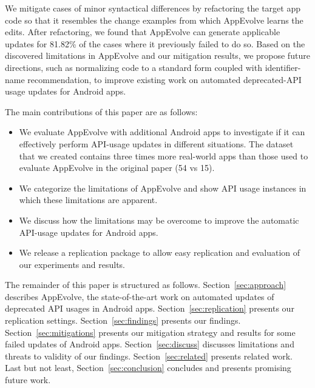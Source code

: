 We mitigate cases of minor syntactical differences by refactoring the
target app code so that it resembles the change examples from which
AppEvolve learns the edits.  After refactoring, we found that AppEvolve can
generate applicable updates for 81.82\% of the cases where it previously failed
to do so.  Based on the discovered limitations in AppEvolve and our
mitigation results, we propose future directions, such as normalizing code
to a standard form coupled with identifier-name recommendation, to improve
existing work on automated deprecated-API usage updates for Android apps.

The main contributions of this paper are as follows:
\begin{itemize}
	\item We  evaluate AppEvolve with additional Android apps to investigate if it can effectively perform API-usage updates in different situations. The dataset that we created contains three times more real-world apps than those used to evaluate AppEvolve in the original paper (54 vs 15).
	\item We categorize the limitations of AppEvolve and show API usage instances in which these limitations are apparent.
	\item We discuss how the limitations may be overcome to improve the automatic API-usage updates for Android apps.
	\item We release a replication package to allow easy replication and evaluation of our experiments and results.%
\end{itemize}

The remainder of this paper is structured as follows. Section~\ref{sec:approach} describes AppEvolve, the state-of-the-art work on automated updates of deprecated API usages in Android apps. Section~\ref{sec:replication} presents our replication settings. Section~\ref{sec:findings} presents our findings. Section~\ref{sec:mitigations} presents our mitigation strategy and results for some failed updates of Android apps.
Section~\ref{sec:discuss} discusses limitations and threats to validity of our findings.
Section~\ref{sec:related} presents related work.
Last but not least, Section~\ref{sec:conclusion} concludes and presents promising future work.
